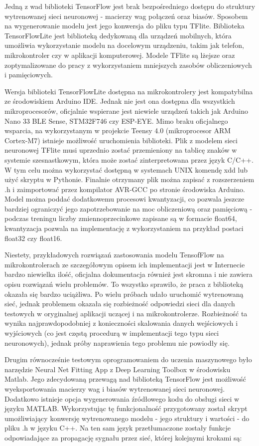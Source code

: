 \documentclass[12pt, a4paper]{article}
\begin{document}
Jedną z wad biblioteki TensorFlow jest brak bezpośredniego dostępu do struktury wytrenowanej sieci neuronowej - macierzy wag połączeń oraz biasów. Sposobem na wygenerowanie modelu jest jego konwersja do pliku typu TFlite. Biblioteka TensorFlowLite jest biblioteką dedykowaną dla urządzeń mobilnych, która umożliwia wykorzystanie modelu na docelowym urządzeniu, takim jak telefon, mikrokontroler czy w aplikacji komputerowej. Modele TFlite są lżejsze oraz zoptymalizowane do pracy z wykorzystaniem mniejszych zasobów obliczeniowych i pamięciowych.

Wersja biblioteki TensorFlowLite dostępna na mikrokontrolery jest kompatybilna ze środowiskiem Arduino IDE. Jednak nie jest ona dostępna dla wszystkich mikroprocesorów, oficjalnie wspierane jest niewiele urządzeń takich jak Arduino Nano 33 BLE Sense, STM32F746 czy ESP-EYE. Mimo braku oficjalnego wsparcia, na wykorzystanym w projekcie Teensy 4.0 (mikroprocesor ARM Cortex-M7) istnieje możliwość uruchomienia biblioteki. Plik z modelem sieci neuronowej TFlite musi uprzednio zostać przemieniony na tablicę znaków w systemie szesnastkowym, która może zostać zinterpretowana przez język C/C++. W tym celu można wykorzystać dostępną w systemach UNIX komendę xdd lub użyć skryptu w Pythonie. Finalnie otrzymany plik można zapisać z rozszerzeniem .h i zaimportować przez kompilator AVR-GCC po stronie środowiska Arduino. Model można poddać dodatkowemu procesowi kwantyzacji, co pozwala jeszcze bardziej ograniczyć jego zapotrzebowanie na moc obliczeniową oraz pamięciową - podczas treningu liczby zmiennoprzecinkowe zapisane są w formacie float64, kwantyzacja pozwala na implementację z wykorzystaniem na przykład postaci float32 czy float16.

Niestety, przykładowych rozwiązań zastosowania modelu TensofFlow na mikrokontrolerach ze szczegółowym opisem ich implementacji jest w Internecie bardzo niewielka ilość, oficjalna dokumentacja również jest skromna i nie zawiera opisu rozwiązań wielu problemów. To wszystko sprawiło, że praca z biblioteką okazała się bardzo uciążliwa. Po wielu próbach udało uruchomić wytrenowaną sieć, jednak problemem okazała się rozbieżność odpowiedzi sieci dla danych testowych w oryginalnej aplikacji uczącej i na mikrokontrolerze. Rozbieżność ta wynika najprawdopodobniej z konieczności skalowania danych wejściowych i wyjściowych (co jest częstą procedurą w implementacji tego typu sieci neuronowych), jednak próby naprawienia tego problemu nie powiodły się. 

Drugim równocześnie testowym oprogramowaniem do uczenia maszynowego było narzędzie Neural Net Fitting App z Deep Learning Toolbox w środowisku Matlab. Jego zdecydowaną przewagą nad biblioteką TensorFlow jest możliwość wyeksportowania macierzy wag i biasów wytrenowanej sieci neuronowej. Dodatkowo istnieje opcja wygenerowania źródłowego kodu do obsługi sieci w języku MATLAB. Wykorzystując tę funkcjonalność przygotowany został skrypt umożliwiający konwersję wytrenowanego modelu - jego struktury i wartości - do pliku .h w języku C++. Na ten sam język przetłumaczone zostały funkcje odpowiadające za propagację sygnału przez sieć, której kolejnymi krokami są:
\end{document}
